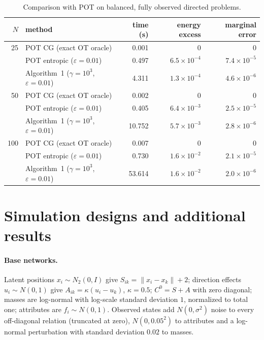 \documentclass[12pt]{article}
\begin{document}
\begin{table}[h]
\caption{Comparison with POT on balanced, fully observed directed problems.}\label{tab:pot}
\centering\small
\begin{tabular}{rlrrr}
\toprule
$N$ & method & time (s) & energy excess & marginal error\\
\midrule
25 & POT CG (exact OT oracle) & 0.001 & 0 & 0\\
 & POT entropic ($\varepsilon=0.01$) & 0.497 & $6.5\times10^{-4}$ & $7.4\times10^{-5}$\\
 & Algorithm~1 ($\gamma=10^3$, $\varepsilon=0.01$) & 4.311 & $1.3\times10^{-4}$ & $4.6\times10^{-6}$\\
50 & POT CG (exact OT oracle) & 0.002 & 0 & 0\\
 & POT entropic ($\varepsilon=0.01$) & 0.405 & $6.4\times10^{-3}$ & $2.5\times10^{-5}$\\
 & Algorithm~1 ($\gamma=10^3$, $\varepsilon=0.01$) & 10.752 & $5.7\times10^{-3}$ & $2.8\times10^{-6}$\\
100 & POT CG (exact OT oracle) & 0.007 & 0 & 0\\
 & POT entropic ($\varepsilon=0.01$) & 0.730 & $1.6\times10^{-2}$ & $2.1\times10^{-5}$\\
 & Algorithm~1 ($\gamma=10^3$, $\varepsilon=0.01$) & 53.614 & $1.6\times10^{-2}$ & $2.0\times10^{-6}$\\
\bottomrule
\end{tabular}

\end{table}

\section{Simulation designs and additional results}\label{sec:simdesign}

\paragraph{Base networks.} Latent positions $x_i\sim N_2(0,I)$ give $S_{ik}=\|x_i-x_k\|+2$; direction effects $u_i\sim N(0,1)$ give $A_{ik}=\kappa(u_i-u_k)$, $\kappa=0.5$; $C^0=S+A$ with zero diagonal; masses are log-normal with log-scale standard deviation $1$, normalized to total one; attributes are $f_i\sim N(0,1)$. Observed states add $N(0,\sigma^2)$ noise to every off-diagonal relation (truncated at zero), $N(0,0.05^2)$ to attributes and a log-normal perturbation with standard deviation $0.02$ to masses.
\end{document}
